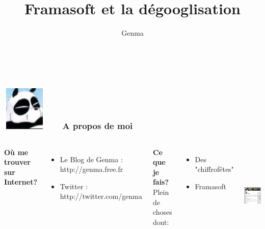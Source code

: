 \documentclass{beamer}
\title[Framasoft et la dégooglisation]{Framasoft et la dégooglisation}
\author{Genma}
\begin{document}
\begin{frame}
	\titlepage
	\vfill
	\begin{center}
		\\[2.5ex]
		{\tiny\CcNote{\CcLongnameByNcSa}}
		\vspace*{-2.5ex}
	\end{center}
\end{frame}



\begin{frame}
\frametitle{\includegraphics[scale=0.4]{./images/Genma.jpg} \ \ \  A propos de moi  }
\begin{columns}[c] 

\textbf{Où me trouver sur Internet?}
\begin{itemize}
\item Le Blog de Genma : http://genma.free.fr
\item Twitter : http://twitter.com/genma
\end{itemize}

\textbf{Ce que je fais?}
\\ Plein de choses dont:
\begin{itemize}
\item Des "chiffrofêtes"
\item Framasoft
\end{itemize}

\includegraphics[width=5cm,height=5cm]{./images/blog.png} 
\end{columns}
\end{frame}
\end{document}
